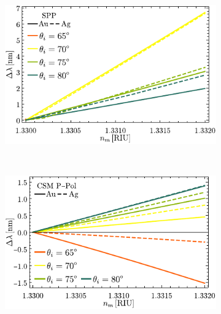 \begin{figure}[h!]\centering
\begin{subfigure}{.01\linewidth}\caption{}\label{sfig:R-RVar-cutp}\vspace{4.5cm}\end{subfigure}
	\begin{subfigure}{.45\linewidth}\hspace*{-1.5em}
	\includegraphics[scale=1]{2-Resultados/figs/11-SPPCSM/4_Sens_h20-SPP.pdf}\end{subfigure}\\
\hspace*{-1.5em}
	\begin{subfigure}{.01\linewidth}\caption{}\label{sfig:R-RVar-cutp}\vspace{4.5cm}\end{subfigure}
	\begin{subfigure}{.45\linewidth}\hspace*{-1.5em}
	\includegraphics[scale=1]{2-Resultados/figs/11-SPPCSM/5_Sens_h20_CSMP.pdf}\end{subfigure}
	\begin{subfigure}{.01\linewidth}\caption{}\label{sfig:R-RVar-cuts}\vspace{4.5cm}\end{subfigure}\hspace*{-1.em}

\end{figure}
